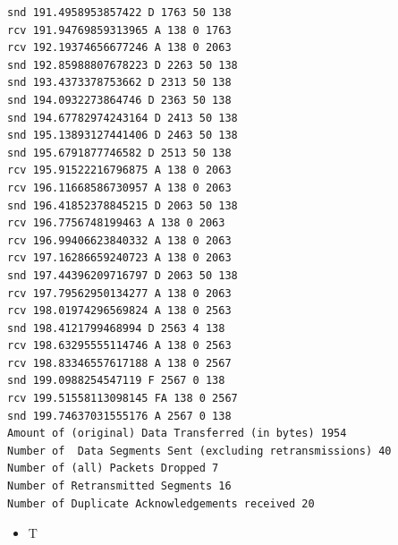 \documentclass[11pt]{article}
\begin{document}
\begin{verbatim}
snd 191.4958953857422 D 1763 50 138
rcv 191.94769859313965 A 138 0 1763
rcv 192.19374656677246 A 138 0 2063
snd 192.85988807678223 D 2263 50 138
snd 193.4373378753662 D 2313 50 138
snd 194.0932273864746 D 2363 50 138
snd 194.67782974243164 D 2413 50 138
snd 195.13893127441406 D 2463 50 138
snd 195.6791877746582 D 2513 50 138
rcv 195.91522216796875 A 138 0 2063
rcv 196.11668586730957 A 138 0 2063
snd 196.41852378845215 D 2063 50 138
rcv 196.7756748199463 A 138 0 2063
rcv 196.99406623840332 A 138 0 2063
rcv 197.16286659240723 A 138 0 2063
snd 197.44396209716797 D 2063 50 138
rcv 197.79562950134277 A 138 0 2063
rcv 198.01974296569824 A 138 0 2563
snd 198.4121799468994 D 2563 4 138
rcv 198.63295555114746 A 138 0 2563
rcv 198.83346557617188 A 138 0 2567
snd 199.0988254547119 F 2567 0 138
rcv 199.51558113098145 FA 138 0 2567
snd 199.74637031555176 A 2567 0 138
Amount of (original) Data Transferred (in bytes) 1954
Number of  Data Segments Sent (excluding retransmissions) 40
Number of (all) Packets Dropped 7
Number of Retransmitted Segments 16
Number of Duplicate Acknowledgements received 20

\end{verbatim}
\begin{itemize}
\item T
\end{itemize}
\end{document}
